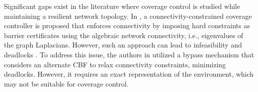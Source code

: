 Significant gaps exist in the literature where coverage control is studied while maintaining a resilient network topology. In \cite{luo2019voronoi}, a connectivity-constrained coverage controller is proposed that enforces connectivity by imposing hard constraints as barrier certificates using the algebraic network connectivity, i.e., eigenvalues of the graph Laplacians. However, such an approach can lead to infeasibility and deadlocks \cite{cavorsi2023multi}. To address this issue, the authors in \cite{cavorsi2023multi} utilized a bypass mechanism that considers an alternate CBF to relax connectivity constraints, minimizing deadlocks. However, it requires an exact representation of the environment, which may not be suitable for coverage control.


